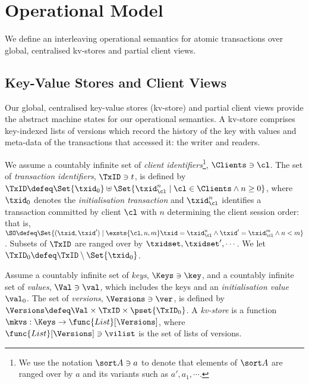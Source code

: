 \section{Operational Model}
\label{sec:model}

We define an interleaving operational semantics for atomic transactions over
global, centralised kv-stores and partial client views. 

\subsection{Key-Value Stores and Client Views}
\label{subsec:kvstores}
\label{sec:mkvs-view}
Our global, centralised key-value stores (kv-store) and partial client views
provide the abstract machine states for our operational semantics. A
kv-store comprises key-indexed lists of versions which record
the history of the key with values and meta-data of the
transactions that accessed it: the writer and readers.

We assume a countably infinite set of \emph{client identifiers}\footnote{ We use the notation
 $\sort A \ni a$ to denote that elements of $\sort A$ are ranged over
  by $a$ and its variants such as $a', a_1, \cdots$.},
$\Clients \ni \cl$.
The set of \emph{transaction identifiers}, $\TxID \ni t$, 
 is defined by
$\TxID \defeq  \Set{\txid_{0}} \uplus \Set{ \txid_{\cl}^{n} \mid \cl
  \in \Clients \land n \geq 0 }$, 
where  $\txid_0$ denotes  the  \emph{initialisation transaction}
and $\txid_{\cl}^{n}$ identifies a transaction committed by client
$\cl$ with $n$  determining  the client session order: that is, $\SO \defeq \Set{ (\txid, \txid') \mid \exsts{ \cl, n,m } \txid =
\txid_{\cl}^{n} \land \txid' = \txid_{\cl}^{m} \land n < m}$.
Subsets of $\TxID$  are ranged over by $\txidset, \txidset', \cdots$. 
We let $\TxID_{0} \defeq \TxID \setminus \Set{\txid_0}$. 

\begin{definition}[Kv-stores]
\label{def:his_heap}
\label{def:mkvs}
Assume a countably infinite set of \emph{keys}, $\Keys \ni \key$, 
and a countably infinite set of  \emph{values}, $\Val \ni \val$, 
which includes the keys and an \emph{initialisation value} $\val_0$.
The set of \emph{versions}, $\Versions \ni \ver$, is defined by $\Versions \defeq \Val \times \TxID \times \pset{\TxID_{0}}$. 
A \emph{kv-store} 
is a function $\mkvs: \Keys \to \func{List}[\Versions]$, 
where $\func{List}[\Versions] \ni \vilist$ is the set of lists of versions. %
\end{definition}


